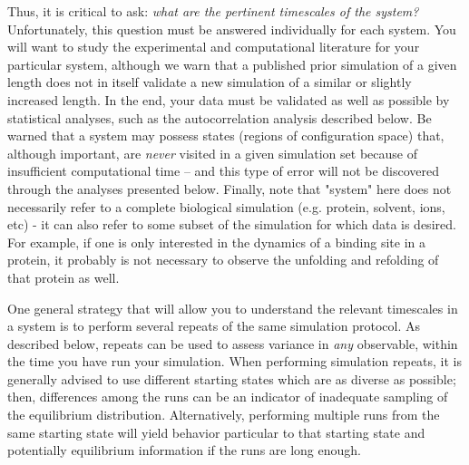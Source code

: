Thus, it is critical to ask: \emph{what are the pertinent timescales of the system?} 
Unfortunately, this question must be answered individually for each system.  You will want to study the experimental and computational literature for your particular system, although we warn that a published prior simulation of a given length does not in itself validate a new simulation of a similar or slightly increased length.  In the end, your data must be validated as well as possible by statistical analyses, such as the autocorrelation analysis described below.  Be warned that a system may possess states (regions of configuration space) that, although important, are \emph{never} visited in a given simulation set because of insufficient computational time \cite{Grossfield2009} -- and this type of error will not be discovered through the analyses presented below.
Finally, note that "system" here does not necessarily refer to a complete biological simulation (e.g. protein, solvent, ions, etc) - it can also refer to some subset of the simulation for which data is desired.  For example, if one is only interested in the dynamics of a binding site in a protein, it probably is not necessary to observe the unfolding and refolding of that protein as well.

One general strategy that will allow you to understand the relevant timescales in a system is to perform several repeats of the same simulation protocol.  As described below, repeats can be used to assess variance in \emph{any} observable, within the time you have run your simulation.
When performing simulation repeats, it is generally advised to use different starting states which are as diverse as possible; then, differences among the runs can be an indicator of inadequate sampling of the equilibrium distribution.
Alternatively, performing multiple runs from the same starting state will yield behavior particular to that starting state and potentially equilibrium information if the runs are long enough.



